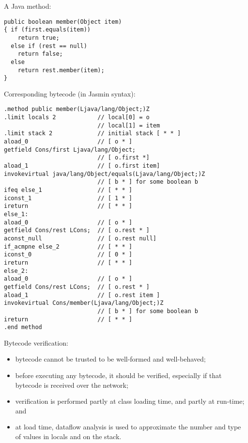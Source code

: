 \begin{slide*}
A Java method:\\
 
\begin{verbatim}
public boolean member(Object item)
{ if (first.equals(item))
    return true;
  else if (rest == null)
    return false;
  else
    return rest.member(item);
}
\end{verbatim}
\vfil
\end{slide*}

\begin{slide*}
Corresponding bytecode (in Jasmin syntax):\\
\begin{scriptsize}
\begin{verbatim}
.method public member(Ljava/lang/Object;)Z
.limit locals 2            // local[0] = o
                           // local[1] = item
.limit stack 2             // initial stack [ * * ]
aload_0                    // [ o * ]
getfield Cons/first Ljava/lang/Object;     
                           // [ o.first *]
aload_1                    // [ o.first item]
invokevirtual java/lang/Object/equals(Ljava/lang/Object;)Z 
                           // [ b * ] for some boolean b 
ifeq else_1                // [ * * ]
iconst_1                   // [ 1 * ]
ireturn                    // [ * * ]
else_1:
aload_0                    // [ o * ]
getfield Cons/rest LCons;  // [ o.rest * ]
aconst_null                // [ o.rest null]
if_acmpne else_2           // [ * * ]
iconst_0                   // [ 0 * ]
ireturn                    // [ * * ]
else_2:
aload_0                    // [ o * ]
getfield Cons/rest LCons;  // [ o.rest * ]
aload_1                    // [ o.rest item ]
invokevirtual Cons/member(Ljava/lang/Object;)Z  
                           // [ b * ] for some boolean b 
ireturn                    // [ * * ]
.end method
\end{verbatim}
\end{scriptsize}
\vfil
\end{slide*}


\begin{slide*}
Bytecode verification:
 
\begin{itemize}
\item bytecode cannot be trusted to be
well-formed and well-behaved;
\item before executing any bytecode, it
should be verified, especially if that bytecode is received over the network;
\item verification is performed partly
at class loading time, and partly at
run-time; and
\item at load time, dataflow
analysis is used to approximate the
number and type of values in locals
and on the stack.
\end{itemize}
\vfil
\end{slide*}

